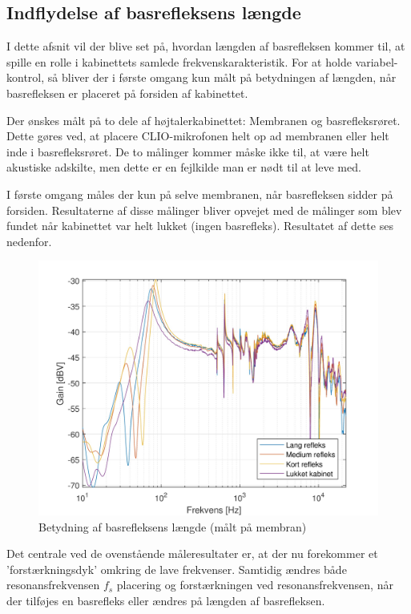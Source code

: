 \newpage
\subsection{Indflydelse af basrefleksens længde}
I dette afsnit vil der blive set på, hvordan længden af basrefleksen kommer til, at spille en rolle i kabinettets samlede frekvenskarakteristik. For at holde variabel-kontrol, så bliver der i første omgang kun målt på betydningen af længden, når basrefleksen er placeret på forsiden af kabinettet.

Der ønskes målt på to dele af højtalerkabinettet: Membranen og basrefleksrøret. Dette gøres ved, at placere CLIO-mikrofonen helt op ad membranen eller helt inde i basrefleksrøret. De to målinger kommer måske ikke til, at være helt akustiske adskilte, men dette er en fejlkilde man er nødt til at leve med.

I første omgang måles der kun på selve membranen, når basrefleksen sidder på forsiden. Resultaterne af disse målinger bliver opvejet med de målinger som blev fundet når kabinettet var helt lukket (ingen basrefleks). Resultatet af dette ses nedenfor.
\begin{figure}[H]
	\centering
	\vspace{-12pt}
	\includegraphics[width=\textwidth]{Billeder/Grafer/BasrefleksLengthMembran}
	\caption{Betydning af basrefleksens længde (målt på membran)}
\end{figure}

Det centrale ved de ovenstående måleresultater er, at der nu forekommer et 'forstærkningsdyk' omkring de lave frekvenser. Samtidig ændres både resonansfrekvensen $f_s$ placering og forstærkningen ved resonansfrekvensen, når der tilføjes en basrefleks eller ændres på længden af basrefleksen.

